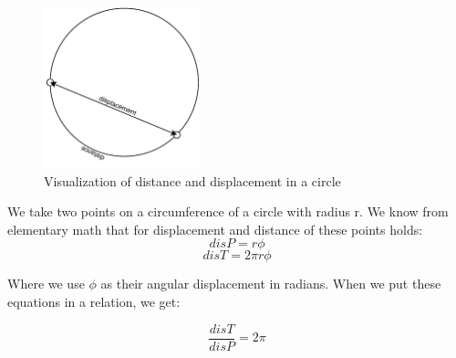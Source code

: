 \documentclass{ctuthesis}
\begin{document}
\begin{figure}
	\includegraphics[width=0.4\textwidth]{displacement}
	\caption{Visualization of distance and displacement in a circle}
	\label{fig:round}
\end{figure}

We take two points on a circumference of a circle with radius r. We know from elementary math that for displacement and distance of these points holds:
\begin{equation}
	disP = r\phi
\end{equation}
\begin{equation}
	disT=2\pi{r}\phi
\end{equation}

Where we use \(\phi\) as their angular displacement in radians. When we put these equations in a relation, we get:

\begin{equation}
	\frac {disT} {disP} = 2\pi
\end{equation}
\end{document}
